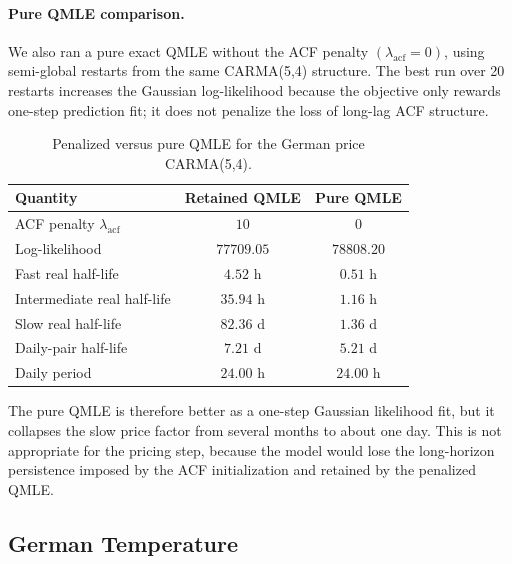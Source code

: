 \paragraph{Pure QMLE comparison.}
We also ran a pure exact QMLE without the ACF penalty
\((\lambda_{\mathrm{acf}}=0)\), using semi-global restarts from the same
CARMA(5,4) structure. The best run over 20 restarts increases the Gaussian
log-likelihood because the objective only rewards one-step prediction fit; it
does not penalize the loss of long-lag ACF structure.

\begin{table}[H]
  \centering
  \caption{Penalized versus pure QMLE for the German price CARMA(5,4).}
  \label{tab:price-pure-qmle-comparison}
  \begin{tabular}{@{}lcc@{}}
    \toprule
    Quantity & Retained QMLE & Pure QMLE \\
    \midrule
    ACF penalty \(\lambda_{\mathrm{acf}}\) & \(10\) & \(0\) \\
    Log-likelihood & \(77709.05\) & \(78808.20\) \\
    Fast real half-life & \(4.52\) h & \(0.51\) h \\
    Intermediate real half-life & \(35.94\) h & \(1.16\) h \\
    Slow real half-life & \(82.36\) d & \(1.36\) d \\
    Daily-pair half-life & \(7.21\) d & \(5.21\) d \\
    Daily period & \(24.00\) h & \(24.00\) h \\
    \bottomrule
  \end{tabular}
\end{table}

The pure QMLE is therefore better as a one-step Gaussian likelihood fit, but it
collapses the slow price factor from several months to about one day. This is
not appropriate for the pricing step, because the model would lose the
long-horizon persistence imposed by the ACF initialization and retained by the
penalized QMLE.

\FloatBarrier

\subsection{German Temperature}\label{ssec:german-temperature-carma-calibration}


